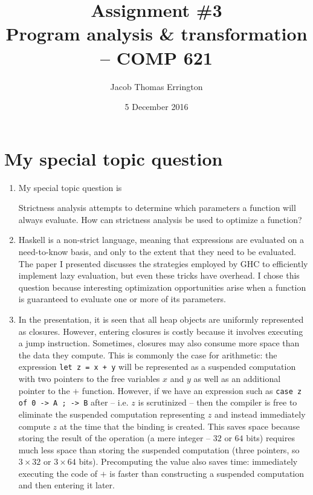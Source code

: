\documentclass[letterpaper,11pt]{article}
\author{Jacob Thomas Errington}
\title{Assignment \#3\\Program analysis \& transformation -- COMP 621}
\date{5 December 2016}
\newcommand{\codesnip}{\texttt}
\begin{document}
\maketitle

\section{My special topic question}

\begin{enumerate}
  \item
    My special topic question is
    \begin{displayquote}
      Strictness analysis attempts to determine which parameters a function
      will always evaluate. How can strictness analysis be used to optimize a
      function?
    \end{displayquote}

  \item
    Haskell is a non-strict language, meaning that expressions are evaluated on
    a need-to-know basis, and only to the extent that they need to be
    evaluated. The paper I presented discusses the strategies employed by GHC
    to efficiently implement lazy evaluation, but even these tricks have
    overhead. I chose this question because interesting optimization
    opportunities arise when a function is guaranteed to evaluate one or more
    of its parameters.

  \item
    In the presentation, it is seen that all heap objects are uniformly
    represented as closures. However, entering closures is costly because it
    involves executing a jump instruction. Sometimes, closures may also consume
    more space than the data they compute. This is commonly the case for
    arithmetic: the expression \codesnip{let z = x + y} will be represented as
    a suspended computation with two pointers to the free variables
    $x$ and $y$ as well as an additional pointer to the $+$ function. However,
    if we have an expression such as
    \codesnip{case z of 0 -> A ; \textunderscore{} -> B}
    after -- i.e. $z$ is scrutinized -- then the compiler is free
    to eliminate the suspended computation representing $z$ and instead
    immediately compute $z$ at the time that the binding is created. This saves
    space because storing the result of the operation (a mere integer -- $32$
    or $64$ bits) requires much less space than storing the suspended
    computation (three pointers, so $3 \times 32$ or $3 \times 64$ bits).
    Precomputing the value also saves time: immediately executing the code of
    $+$ is faster than constructing a suspended computation and then entering
    it later.


\end{enumerate}
\end{document}
